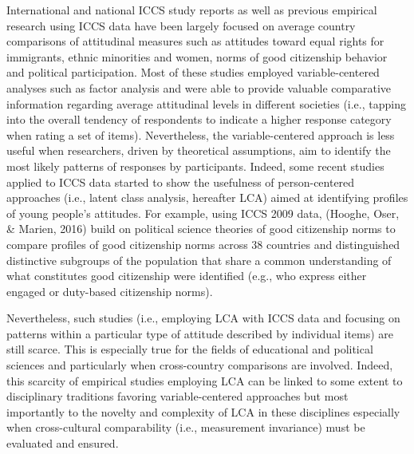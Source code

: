 \documentclass[12pt,a4paper,oneside]{reedthesis}
\begin{document}
International and national ICCS study reports as well as previous empirical research using ICCS data have been largely focused on average country comparisons of attitudinal measures such as attitudes toward equal rights for immigrants, ethnic minorities and women, norms of good citizenship behavior and political participation. Most of these studies employed variable-centered analyses such as factor analysis and were able to provide valuable comparative information regarding average attitudinal levels in different societies (i.e., tapping into the overall tendency of respondents to indicate a higher response category when rating a set of items). Nevertheless, the variable-centered approach is less useful when researchers, driven by theoretical assumptions, aim to identify the most likely patterns of responses by participants. Indeed, some recent studies applied to ICCS data started to show the usefulness of person-centered approaches (i.e., latent class analysis, hereafter LCA) aimed at identifying profiles of young people's attitudes. For example, using ICCS 2009 data, (Hooghe, Oser, \& Marien, 2016) build on political science theories of good citizenship norms to compare profiles of good citizenship norms across 38 countries and distinguished distinctive subgroups of the population that share a common understanding of what constitutes good citizenship were identified (e.g., who express either engaged or duty-based citizenship norms).

Nevertheless, such studies (i.e., employing LCA with ICCS data and focusing on patterns within a particular type of attitude described by individual items) are still scarce. This is especially true for the fields of educational and political sciences and particularly when cross-country comparisons are involved. Indeed, this scarcity of empirical studies employing LCA can be linked to some extent to disciplinary traditions favoring variable-centered approaches but most importantly to the novelty and complexity of LCA in these disciplines especially when cross-cultural comparability (i.e., measurement invariance) must be evaluated and ensured.
\end{document}
